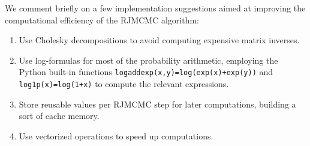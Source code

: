 We comment briefly on a few implementation suggestions aimed at improving the computational efficiency of the \acs{RJMCMC} algorithm:

\begin{enumerate}
  \item Use Cholesky decompositions to avoid computing expensive matrix inverses.
  \item Use log-formulas for most of the probability arithmetic, employing the Python built-in functions \texttt{logaddexp(x,y)=log(exp(x)+exp(y))} and \texttt{log1p(x)=log(1+x)} to compute the relevant expressions.
  \item Store reusable values per \acs{RJMCMC} step for later computations, building a sort of cache memory.
  \item Use vectorized operations to speed up computations.
\end{enumerate}


